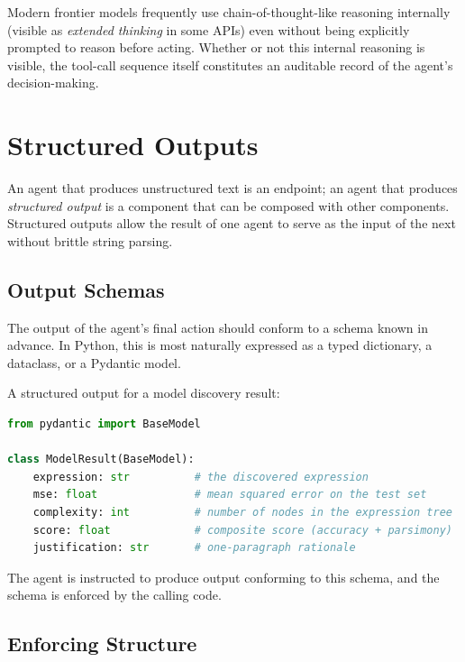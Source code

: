 \begin{remark}
Modern frontier models frequently use chain-of-thought-like reasoning internally (visible as \emph{extended thinking} in some APIs) even without being explicitly prompted to reason before acting.
Whether or not this internal reasoning is visible, the tool-call sequence itself constitutes an auditable record of the agent's decision-making.
\end{remark}

\section{Structured Outputs}
\label{section:StructuredOutputs}

An agent that produces unstructured text is an endpoint; an agent that produces \emph{structured output} is a component that can be composed with other components.
Structured outputs allow the result of one agent to serve as the input of the next without brittle string parsing.

\subsection{Output Schemas}

The output of the agent's final action should conform to a schema known in advance.
In Python, this is most naturally expressed as a typed dictionary, a dataclass, or a Pydantic model.

\begin{example}
A structured output for a model discovery result:
\begin{lstlisting}[language=python]
from pydantic import BaseModel

class ModelResult(BaseModel):
    expression: str          # the discovered expression
    mse: float               # mean squared error on the test set
    complexity: int          # number of nodes in the expression tree
    score: float             # composite score (accuracy + parsimony)
    justification: str       # one-paragraph rationale
\end{lstlisting}
The agent is instructed to produce output conforming to this schema, and the schema is enforced by the calling code.
\end{example}

\subsection{Enforcing Structure}


